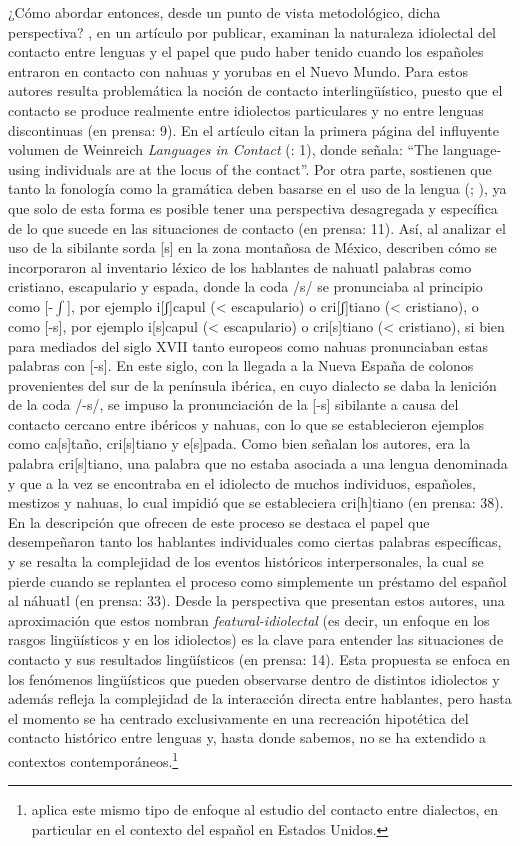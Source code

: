 \documentclass[output=paper]{langscibook}
\begin{document}
¿Cómo abordar entonces, desde un punto de vista metodológico, dicha perspectiva? \citet{OtheguyShinDanielEnprensa}, en un artículo por publicar, examinan la naturaleza idiolectal del contacto entre lenguas y el papel que pudo haber tenido cuando los españoles entraron en contacto con nahuas y yorubas en el Nuevo Mundo. Para estos autores resulta problemática la noción de contacto interlingüístico, puesto que el contacto se produce realmente entre idiolectos particulares y no entre lenguas discontinuas (en prensa: 9). En el artículo citan la primera página del influyente volumen de Weinreich \emph {Languages in Contact}  (\citeyear{Weinreich1953}: 1), donde señala: “The language-using individuals are at the locus of the contact”. Por otra parte, sostienen que tanto la fonología como la gramática deben basarse en el uso de la lengua (\citealt{BybeeHopper2001}; \citealt{Bybee2010}), ya que solo de esta forma es posible tener una perspectiva desagregada y específica de lo que sucede en las situaciones de contacto (en prensa: 11). Así, al analizar el uso de la sibilante sorda [s] en la zona montañosa de México, describen cómo se incorporaron al inventario léxico de los hablantes de nahuatl palabras como cristiano, escapulario y espada, donde la coda /s/ se pronunciaba al principio como [-${\int}$], por ejemplo i[ʃ]capul (< escapulario) o cri[ʃ]tiano (< cristiano), o como [-s], por ejemplo i[s]capul (< escapulario) o cri[s]tiano (< cristiano), si bien para mediados del siglo XVII tanto europeos como nahuas pronunciaban estas palabras con [-s]. En este siglo, con la llegada a la Nueva España de colonos provenientes del sur de la península ibérica, en cuyo dialecto se daba la lenición de la coda /-s/, se impuso la pronunciación de la [-s] sibilante a causa del contacto cercano entre ibéricos y nahuas, con lo que se establecieron ejemplos como ca[s]taño, cri[s]tiano y e[s]pada. Como bien señalan los autores, era la palabra cri[s]tiano, una palabra que no estaba asociada a una lengua denominada y que a la vez se encontraba en el idiolecto de muchos individuos, españoles, mestizos y nahuas, lo cual impidió que se estableciera cri[h]tiano (en prensa: 38). En la descripción que ofrecen de este proceso se destaca el papel que desempeñaron tanto los hablantes individuales como ciertas palabras específicas, y se resalta la complejidad de los eventos históricos interpersonales, la cual se pierde cuando se replantea el proceso como simplemente un préstamo del español al náhuatl (en prensa: 33). Desde la perspectiva que presentan estos autores, una aproximación que estos nombran \emph {featural-idiolectal} (es decir, un enfoque en los rasgos lingüísticos y en los idiolectos) es la clave para entender las situaciones de contacto y sus resultados lingüísticos (en prensa: 14). Esta propuesta se enfoca en los fenómenos lingüísticos que pueden observarse dentro de distintos idiolectos y además refleja la complejidad de la interacción directa entre hablantes, pero hasta el momento se ha centrado exclusivamente en una recreación hipotética del contacto histórico entre lenguas y, hasta donde sabemos, no se ha extendido a contextos contemporáneos.\footnote{\citet{Erker2017} aplica este mismo tipo de enfoque al estudio del contacto entre dialectos, en particular en el contexto del español en Estados Unidos.}
\end{document}
